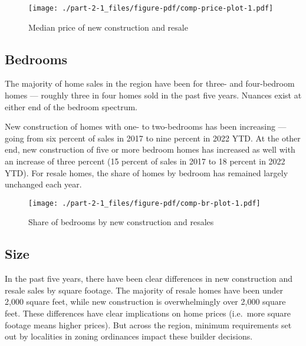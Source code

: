 \documentclass[
  letterpaper,
  DIV=11,
  numbers=noendperiod]{scrreprt}
\begin{document}
\begin{figure}

{\centering \texttt{[image: ./part-2-1\_files/figure-pdf/comp-price-plot-1.pdf]}

}

\caption{Median price of new construction and resale}

\end{figure}

\hypertarget{bedrooms-1}{%
\subsection{Bedrooms}\label{bedrooms-1}}

The majority of home sales in the region have been for three- and
four-bedroom homes --- roughly three in four homes sold in the past five
years. Nuances exist at either end of the bedroom spectrum.

New construction of homes with one- to two-bedrooms has been increasing
--- going from six percent of sales in 2017 to nine percent in 2022 YTD.
At the other end, new construction of five or more bedroom homes has
increased as well with an increase of three percent (15 percent of sales
in 2017 to 18 percent in 2022 YTD). For resale homes, the share of homes
by bedroom has remained largely unchanged each year.

\begin{figure}

{\centering \texttt{[image: ./part-2-1\_files/figure-pdf/comp-br-plot-1.pdf]}

}

\caption{Share of bedrooms by new construction and resales}

\end{figure}

\hypertarget{size}{%
\subsection{Size}\label{size}}

In the past five years, there have been clear differences in new
construction and resale sales by square footage. The majority of resale
homes have been under 2,000 square feet, while new construction is
overwhelmingly over 2,000 square feet. These differences have clear
implications on home prices (i.e.~more square footage means higher
prices). But across the region, minimum requirements set out by
localities in zoning ordinances impact these builder decisions.
\end{document}
